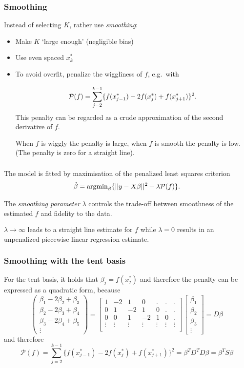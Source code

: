 \documentclass{beamer}
\newcommand{\bs}{\bigskip}
\begin{document}
\begin{frame}
\frametitle{Smoothing}

Instead of selecting $K$, rather use \textit{smoothing}:

\begin{itemize}
\item Make $K$ `large enough' (negligible bias)
\item Use even spaced $x_k^*$
\item To avoid overfit, penalize the wiggliness of $f$, e.g.\ with 

$${\cal P} (f) = \sum_{j=2}^{k-1} \{f(x_{j-1}^*) - 2 f(x_j^*) + f(x_{j+1}^*) \}^2.$$
This penalty can be regarded as  a crude approximation of the second derivative of $f$.

\bs
When $f$ is wiggly the penalty is large, when $f$ is smooth the penalty is low. (The penalty is zero for a straight line).
\end{itemize}
\end{frame}

\begin{frame}
\frametitle{}
The model is fitted by maximisation of the penalized least squares criterion
 $$\hat{\beta} = \mbox{argmin}_{\beta} \{  ||y - X \beta ||^2 + \lambda {\cal P}(f) \}.$$

\bs
The \textit{smoothing parameter} $\lambda$ controls the trade-off between smoothness of the estimated $f$ and fidelity to the data.

\bs
 $\lambda \rightarrow \infty$ leads to a straight line estimate for $f$ while $\lambda=0$ results in an unpenalized piecewise linear regression estimate.
\end{frame}

\begin{frame}
\frametitle{Smoothing with the tent basis}
For the tent basis, it holds that $\beta_j = f(x_j^*)$ and therefore the penalty can be expressed as a quadratic form, because
$$ \left( 
\begin{array}{c}
\beta_1 - 2 \beta_2 + \beta_3 \\
\beta_2 - 2 \beta_3 + \beta_4 \\
\beta_3 - 2 \beta_4 + \beta_5 \\
\vdots
\end{array}
\right) = \left[
\begin{array}{ccccccc}
1 & -2 & 1 & 0 & . & . & . \\
0 & 1 & -2 & 1 & 0 & . & . \\
0 & 0 & 1 & -2 & 1 & 0 & . \\
\vdots & \vdots &\vdots &\vdots &\vdots &\vdots &\vdots \\
\end{array}
\right]  \left[
\begin{array}{c}
\beta_1 \\
\beta_2 \\
\beta_3 \\
\vdots
\end{array}
\right] = D \beta
$$
and therefore 
$$ {\mathcal P}(f) = \sum_{j=2}^{k-1} \{f(x_{j-1}^*) - 2 f(x_j^*) + f(x_{j+1}^*) \}^2 = \beta^T D^T D \beta = \beta^T S \beta$$
\end{frame}
\end{document}
